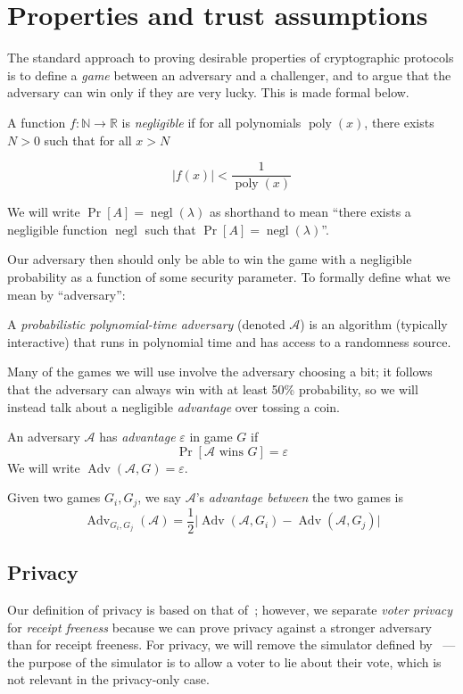 \documentclass[11pt,twoside,a4paper]{article}
\DeclareMathOperator{\poly}{\text{poly}}
\DeclareMathOperator{\negl}{\text{negl}}
\DeclareMathOperator{\Adv}{\text{Adv}}
\theoremstyle{definition}
\begin{document}
\section{Properties and trust assumptions}\label{sec-properties}
The standard approach to proving desirable properties of cryptographic protocols is to define a \textit{game} between an adversary and a challenger, and to argue that the adversary can win only if they are very lucky. This is made formal below.
\begin{definition}
    A function $f:\mathbb{N}\rightarrow\mathbb{R}$ is \textit{negligible} if for all polynomials $\poly(x)$, there exists $N>0$ such that for all $x>N$

    $$|f(x)|<\frac{1}{\poly(x)}$$

    We will write $\Pr[A]=\negl(\lambda)$ as shorthand to mean ``there exists a negligible function $\negl$ such that $\Pr[A]=\negl(\lambda)$''.
\end{definition}
Our adversary then should only be able to win the game with a negligible probability as a function of some security parameter. To formally define what we mean by ``adversary'':
\begin{definition}
    A \textit{probabilistic polynomial-time adversary} (denoted $\mathcal{A}$) is an algorithm (typically interactive) that runs in polynomial time and has access to a randomness source.
\end{definition}
Many of the games we will use involve the adversary choosing a bit; it follows that the adversary can always win with at least 50\% probability, so we will instead talk about a negligible \textit{advantage} over tossing a coin. 
\begin{definition}[Advantage]
    An adversary $\mathcal{A}$ has \textit{advantage} $\varepsilon$ in game $G$ if
    $$\Pr\left[\mathcal{A}\text{ wins }G\right]=\varepsilon$$
    We will write $\Adv(\mathcal{A}, G)=\varepsilon$.

    Given two games $G_i, G_j$, we say $\mathcal{A}$'s \textit{advantage between} the two games is
    $$\Adv_{G_i, G_j}(\mathcal{A}) = \frac{1}{2}
    \Big|
        \Adv(\mathcal{A}, G_i)
         -
        \Adv(\mathcal{A}, G_j)
    \Big|$$
\end{definition}
\subsection{Privacy}
Our definition of privacy is based on that of~\cite{kiayias2015end}; however, we separate \textit{voter privacy} for \textit{receipt freeness} because we can prove privacy against a stronger adversary than for receipt freeness. For privacy, we will remove the simulator defined by~\cite{kiayias2015end} --- the purpose of the simulator is to allow a voter to lie about their vote, which is not relevant in the privacy-only case.
\end{document}
